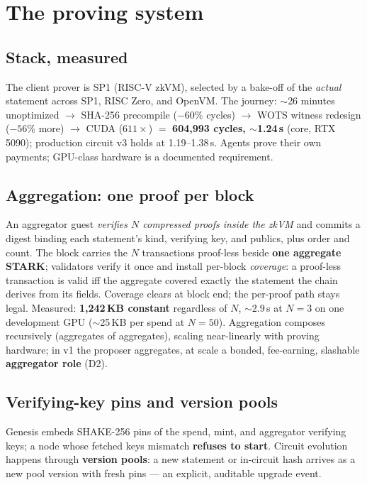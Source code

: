 \documentclass[11pt]{article}
\begin{document}
\section{The proving system}\label{sec:proving}
\subsection{Stack, measured}
The client prover is SP1 (RISC-V zkVM), selected by a bake-off of the \emph{actual} statement across SP1, RISC Zero, and OpenVM. The journey: $\sim$26 minutes unoptimized $\rightarrow$ SHA-256 precompile ($-60\%$ cycles) $\rightarrow$ WOTS witness redesign ($-56\%$ more) $\rightarrow$ CUDA ($611\times$) $=$ \textbf{604{,}993 cycles, $\sim$1.24\,s} (core, RTX 5090); production circuit v3 holds at 1.19--1.38\,s. Agents prove their own payments; GPU-class hardware is a documented requirement.

\subsection{Aggregation: one proof per block}
An aggregator guest \emph{verifies $N$ compressed proofs inside the zkVM} and commits a digest binding each statement's kind, verifying key, and publics, plus order and count. The block carries the $N$ transactions proof-less beside \textbf{one aggregate STARK}; validators verify it once and install per-block \emph{coverage}: a proof-less transaction is valid iff the aggregate covered exactly the statement the chain derives from its fields. Coverage clears at block end; the per-proof path stays legal. Measured: \textbf{1{,}242\,KB constant} regardless of $N$, $\sim$2.9\,s at $N{=}3$ on one development GPU ($\sim$25\,KB per spend at $N{=}50$). Aggregation composes recursively (aggregates of aggregates), scaling near-linearly with proving hardware; in v1 the proposer aggregates, at scale a bonded, fee-earning, slashable \textbf{aggregator role} (D2).

\subsection{Verifying-key pins and version pools}
Genesis embeds SHAKE-256 pins of the spend, mint, and aggregator verifying keys; a node whose fetched keys mismatch \textbf{refuses to start}. Circuit evolution happens through \textbf{version pools}: a new statement or in-circuit hash arrives as a new pool version with fresh pins --- an explicit, auditable upgrade event.
\end{document}
